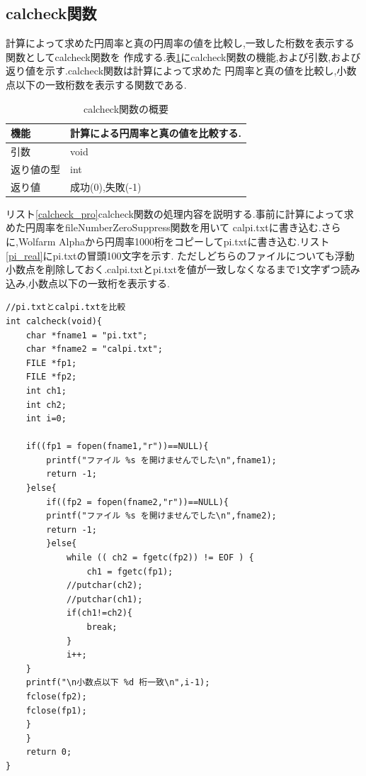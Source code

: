 \documentclass[a4j] {jarticle}
\begin{document}
\subsection{calcheck関数}
計算によって求めた円周率と真の円周率の値を比較し,一致した桁数を表示する関数としてcalcheck関数を
作成する.表\ref{calcheck}にcalcheck関数の機能,および引数,および返り値を示す.calcheck関数は計算によって求めた
円周率と真の値を比較し,小数点以下の一致桁数を表示する関数である.

\begin{table}[H]
  \caption{calcheck関数の概要}
  \label{calcheck}
  \begin{center}
      \begin{tabular}{|l|l|}\hline
      機能 & 計算による円周率と真の値を比較する.\\ \hline
      引数 & void\\ \hline
      返り値の型 & int\\ \hline
      返り値 & 成功(0),失敗(-1)\\ \hline
      \end{tabular}
  \end{center}
  \end{table}

  リスト\ref{calcheck_pro}calcheck関数の処理内容を説明する.事前に計算によって求めた円周率をfileNumberZeroSuppress関数を用いて
  calpi.txtに書き込む.さらに,Wolfarm Alpha\cite{key2}から円周率1000桁をコピーしてpi.txtに書き込む.リスト\ref{pi_real}にpi.txtの冒頭100文字を示す.
  ただしどちらのファイルについても浮動小数点を削除しておく.calpi.txtとpi.txtを値が一致しなくなるまで1文字ずつ読み込み,小数点以下の一致桁を表示する.
  \begin{lstlisting}[basicstyle=\ttfamily\footnotesize, frame=single,label=calcheck_pro,caption=calcheck関数のソースコード]
//pi.txtとcalpi.txtを比較
int calcheck(void){
    char *fname1 = "pi.txt";
    char *fname2 = "calpi.txt";
    FILE *fp1;
    FILE *fp2;
    int ch1;
    int ch2;
    int i=0;

    if((fp1 = fopen(fname1,"r"))==NULL){
        printf("ファイル %s を開けませんでした\n",fname1);
        return -1;
    }else{
        if((fp2 = fopen(fname2,"r"))==NULL){
        printf("ファイル %s を開けませんでした\n",fname2);
        return -1;
        }else{
            while (( ch2 = fgetc(fp2)) != EOF ) {
                ch1 = fgetc(fp1);
            //putchar(ch2);
            //putchar(ch1);
            if(ch1!=ch2){
                break;
            }
            i++;
    }
    printf("\n小数点以下 %d 桁一致\n",i-1);
    fclose(fp2);
    fclose(fp1);
    }
    }
    return 0;
}
  \end{lstlisting}
\end{document}
